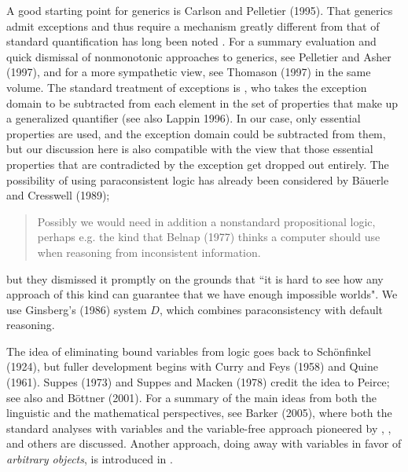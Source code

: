 A good starting point for generics is Carlson and Pelletier (1995).  That
generics admit exceptions and thus require a mechanism greatly different from
that of standard quantification has long been noted \cite{Jespersen:1924}. For
a summary evaluation and quick dismissal of nonmonotonic approaches to
generics, see Pelletier and Asher (1997), and for a more sympathetic view, see
Thomason (1997) in the same volume. The standard treatment of exceptions is
, who takes the exception domain to be subtracted from
each element in the set of properties that make up a generalized quantifier
(see also Lappin 1996).\nocite{Lappin:1996} In our case, only essential
properties are used, and the exception domain could be subtracted from them,
but our discussion here is also compatible with the view that those essential
properties that are contradicted by the exception get dropped out entirely.
\nocite{Thomason:1997}\nocite{Pelletier:1997}\nocite{Carlson:1995} The
possibility of using paraconsistent logic has already been considered by
B\"{a}uerle and Cresswell (1989);

\begin{quote}
Possibly we would need in addition a nonstandard propositional logic, perhaps
e.g. the kind that Belnap (1977) thinks a computer should use when reasoning
from inconsistent information.
\end{quote}

\noindent 
but they dismissed it promptly on the grounds that ``it is hard to see how any
approach of this kind can guarantee that we have enough impossible worlds".
We use Ginsberg's (1986) system $D$, which combines paraconsistency with
default reasoning.

The idea of eliminating bound variables from logic goes back to
Sch\"{o}nfinkel (1924), \nocite{Scho2nfinkel:1924} but fuller development
begins with Curry and Feys (1958) and Quine (1961). Suppes (1973) and Suppes
and Macken (1978) credit the idea to Peirce; see also  and
B\"ottner (2001).\nocite{Bo2ttner:2001}
\nocite{Suppes:1973}\nocite{Suppes:1978} For a summary of the main ideas from
both the linguistic and the mathematical perspectives, see Barker
(2005),\nocite{Barker:2005} where both the standard analyses with variables
and the variable-free approach pioneered by ,
, and others are discussed.  Another approach, doing
away with variables in favor of {\it arbitrary objects}, is introduced in
.

